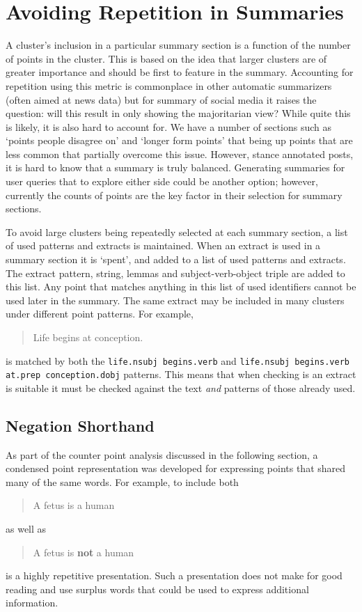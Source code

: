   \section{Avoiding Repetition in Summaries}
    A cluster's inclusion in a particular summary section is a function of the number of points in the cluster. This is based on the idea that larger clusters are of greater importance and should be first to feature in the summary. Accounting for repetition using this metric is commonplace in other automatic summarizers (often aimed at news data) but for summary of social media it raises the question: will this result in only showing the majoritarian view? While quite this is likely, it is also hard to account for. We have a number of sections such as `points people disagree on' and `longer form points' that being up points that are less common that partially overcome this issue. However, stance annotated posts, it is hard to know that a summary is truly balanced. Generating summaries for user queries that to explore either side could be another option; however, currently the counts of points are the key factor in their selection for summary sections.

    To avoid large clusters being repeatedly selected at each summary section, a list of used patterns and extracts is maintained. When an extract is used in a summary section it is `spent', and added to a list of used patterns and extracts. The extract pattern, string, lemmas and subject-verb-object triple are added to this list. Any point that matches anything in this list of used identifiers cannot be used later in the summary. The same extract may be included in many clusters under different point patterns. For example, \blockquote{Life begins at conception.} is matched by both the \texttt{life.nsubj begins.verb} and \texttt{life.nsubj begins.verb at.prep conception.dobj} patterns. This means that when checking is an extract is suitable it must be checked against the text \textit{and} patterns of those already used.

    \tocless\subsection{Negation Shorthand}
      As part of the counter point analysis discussed in the following section, a condensed point representation was developed for expressing points that shared many of the same words. For example, to include both \blockquote{A fetus is a human} as well as \blockquote{A fetus is \textbf{not} a human} is a highly repetitive presentation. Such a presentation does not make for good reading and use surplus words that could be used to express additional information.


